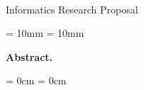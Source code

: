 \thispagestyle{plain}

\begin{center}
  \Huge
  \textbf{\@title}\\
  \vspace{.5em}
  \normalsize
  Informatics Research Proposal\\
  \@author
  \vspace{.4em}
\end{center}

\newcommand{\abstractmargin}{10mm}

\leftskip  = \abstractmargin
\rightskip = \abstractmargin

\footnotesize
\noindent
\textbf{Abstract.}


\leftskip  = 0cm
\rightskip = 0cm
\vspace{.5em}
